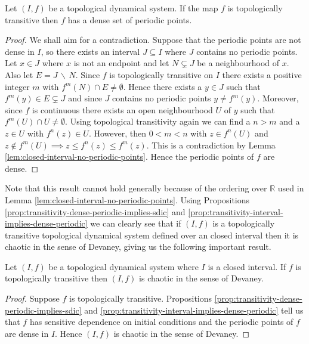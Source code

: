\begin{prop} \label{prop:transitivity-interval-implies-dense-periodic}
    Let $(I, f)$ be a topological dynamical system. If the map $f$ is topologically transitive then $f$ has a dense set of periodic points.
    \begin{proof}
        We shall aim for a contradiction. Suppose that the periodic points are not dense in $I$, so there exists an interval $J \subseteq I$ where $J$ contains no periodic points. Let $x \in J$ where $x$ is not an endpoint and let $N \subsetneq J$ be a neighbourhood of $x$. Also let $E = J\, \backslash\, N$. Since $f$ is topologically transitive on $I$ there exists a positive integer $m$ with $f^m(N) \cap E \neq \emptyset$. Hence there exists a $y \in J$ such that $f^m(y) \in E \subsetneq J$ and since $J$ contains no periodic points $y \neq f^m(y)$. Moreover, since $f$ is continuous there exists an open neighbourhood $U$ of $y$ such that $f^m(U) \cap U \neq \emptyset$. Using topological transitivity again we can find a $n > m$ and a $z \in U$ with $f^n(z) \in U$. However, then $0 < m < n$ with $z \in f^n(U)$ and $z \notin f^m(U) \implies z \leq f^n(z) \leq f^m(z)$. This is a contradiction by Lemma \ref{lem:closed-interval-no-periodic-points}. Hence the periodic points of $f$ are dense.
    \end{proof}
\end{prop}

Note that this result cannot hold generally because of the ordering over $\mathbb{R}$ used in Lemma \ref{lem:closed-interval-no-periodic-points}. Using Propositions \ref{prop:transitivity-dense-periodic-implies-sdic} and \ref{prop:transitivity-interval-implies-dense-periodic} we can clearly see that if $(I, f)$ is a topologically transitive topological dynamical system defined over an closed interval then it is chaotic in the sense of Devaney, giving us the following important result.

\begin{prop}\label{prop:chaotic-transitive}
    Let $(I, f)$ be a topological dynamical system where $I$ is a closed interval. If $f$ is topologically transitive then $(I, f)$ is chaotic in the sense of Devaney.
    \begin{proof}
        Suppose $f$ is topologically transitive. Propositions \ref{prop:transitivity-dense-periodic-implies-sdic} and \ref{prop:transitivity-interval-implies-dense-periodic} tell us that $f$ has sensitive dependence on initial conditions and the periodic points of $f$ are dense in $I$. Hence $(I, f)$ is chaotic in the sense of Devaney.
    \end{proof}
\end{prop}

